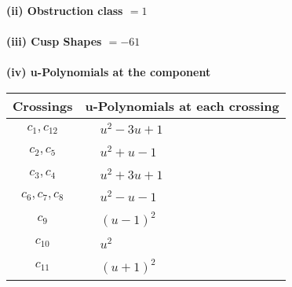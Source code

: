 \documentclass[1p]{elsarticle_modified}
\theoremstyle{definition}
\begin{document}
\flushleft \textbf{(ii) Obstruction class $= 1$}\\~\\
\flushleft \textbf{(iii) Cusp Shapes $= -61$}\\~\\
\newpage\renewcommand{\arraystretch}{1}
\flushleft \textbf{(iv) u-Polynomials at the component}\newline \\
\begin{tabular}{m{50pt}|m{274pt}}
Crossings & \hspace{64pt}u-Polynomials at each crossing \\
\hline $$\begin{aligned}c_{1},c_{12}\end{aligned}$$&$\begin{aligned}
&u^2-3 u+1
\end{aligned}$\\
\hline $$\begin{aligned}c_{2},c_{5}\end{aligned}$$&$\begin{aligned}
&u^2+u-1
\end{aligned}$\\
\hline $$\begin{aligned}c_{3},c_{4}\end{aligned}$$&$\begin{aligned}
&u^2+3 u+1
\end{aligned}$\\
\hline $$\begin{aligned}c_{6},c_{7},c_{8}\end{aligned}$$&$\begin{aligned}
&u^2- u-1
\end{aligned}$\\
\hline $$\begin{aligned}c_{9}\end{aligned}$$&$\begin{aligned}
&(u-1)^2
\end{aligned}$\\
\hline $$\begin{aligned}c_{10}\end{aligned}$$&$\begin{aligned}
&u^2
\end{aligned}$\\
\hline $$\begin{aligned}c_{11}\end{aligned}$$&$\begin{aligned}
&(u+1)^2
\end{aligned}$\\
\hline
\end{tabular}\\~\\
\end{document}

